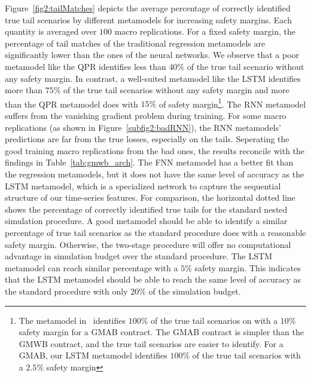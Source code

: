 Figure~\ref{fig2:tailMatches} depicts the average percentage of correctly identified true tail scenarios by different metamodels for increasing safety margins.
Each quantity is averaged over $100$ macro replications.
For a fixed safety margin, the percentage of tail matches of the traditional regression metamodels are significantly lower than the ones of the neural networks.
We observe that a poor metamodel like the QPR identifies less than $40\%$ of the true tail scenario without any safety margin.
In contrast, a well-suited metamodel like the LSTM identifies more than $75\%$ of the true tail scenarios without any safety margin and more than the QPR metamodel does with $15\%$ of safety margin\footnote{The metamodel in~\cite{dang2020efficient} identifies $100\%$ of the true tail scenarios on with a $10\%$ safety margin for a GMAB contract.
The GMAB contract is simpler than the GMWB contract, and the true tail scenarios are easier to identify. 
For a GMAB, our LSTM metamodel identifies $100\%$ of the true tail scenarios with a $2.5\%$ safety margin}.
The RNN metamodel suffers from the vanishing gradient problem during training. 
For some macro replications (as shown in Figure~\ref{subfig2:badRNN}), the RNN metamodels' predictions are far from the true losses, especially on the tails.
Seperating the good training macro replications from the bad ones, the results reconcile with the findings in Table~\ref{tab:gmwb_arch}.
The FNN metamodel has a better fit than the regression metamodels, but it does not have the same level of accuracy as the LSTM metamodel, which is a specialized network to capture the sequential structure of our time-series features.
For comparison, the horizontal dotted line shows the percentage of correctly identified true tails for the standard nested simulation procedure.
A good metamodel should be able to identify a similar percentage of true tail scenarios as the standard procedure does with a reasonable safety margin.
Otherwise, the two-stage procedure will offer no computational advantage in simulation budget over the standard procedure.
The LSTM metamodel can reach similar percentage with a $5\%$ safety margin.
This indicates that the LSTM metamodel should be able to reach the same level of accuracy as the standard procedure with only $20\%$ of the simulation budget.

